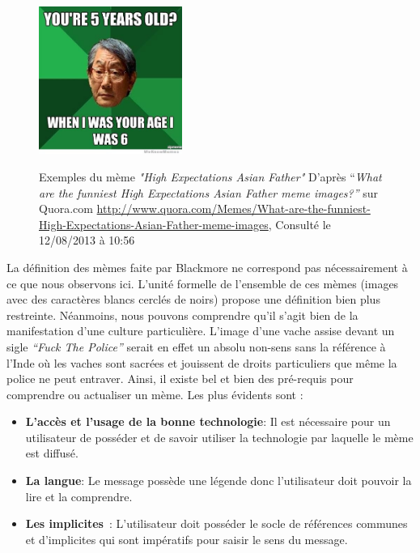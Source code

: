 \begin{figure}[hbp]
{        \includegraphics[width=1.8449in,height=1.9in]{figures/chap2/chapitre2-img13.jpg}
    }
    \caption[Mème ``High Expectations Asian Father'' d'après Quora.com]{Exemples du mème \textit{"High Expectations Asian Father"} D{\textquoteright}après {\textquotedblleft}\textit{What are the funniest High Expectations Asian Father meme images?{\textquotedblright}} sur Quora.com \url{http://www.quora.com/Memes/What-are-the-funniest-High-Expectations-Asian-Father-meme-images}, Consulté le 12/08/2013 à 10:56}
\end{figure}

La définition des mèmes faite par Blackmore ne correspond pas nécessairement à ce que nous observons ici. L{\textquoteright}unité formelle de l{\textquoteright}ensemble de ces mèmes (images avec des caractères blancs cerclés de noirs) propose une définition bien plus restreinte. Néanmoins, nous pouvons comprendre qu{\textquoteright}il s{\textquoteright}agit bien de la manifestation d{\textquoteright}une culture particulière. L{\textquoteright}image d{\textquoteright}une vache assise devant un sigle \textit{{\textquotedblleft}Fuck The Police{\textquotedblright} }serait en effet un absolu non-sens sans la référence à l{\textquoteright}Inde o\`u les vaches sont sacrées et jouissent de droits particuliers que même la police ne peut entraver. Ainsi, il existe bel et bien des pré-requis pour comprendre ou actualiser un mème. Les plus évidents sont :

\begin{itemize}
    \item \textbf{L’accès et l’usage de la bonne technologie}: Il est nécessaire pour un utilisateur de posséder et de savoir utiliser la technologie par laquelle le mème est diffusé.
    \item \textbf{La langue}: Le message possède une légende donc l’utilisateur doit pouvoir la lire et la comprendre.
    \item \textbf{Les implicites} : L’utilisateur doit posséder le socle de références communes et d’implicites qui sont impératifs pour saisir le sens du message. 
\end{itemize}

